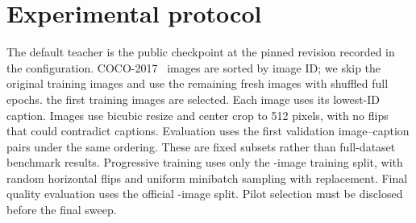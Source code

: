 \documentclass[10pt,twocolumn,letterpaper]{article}
\begin{document}
\section{Experimental protocol}
The default teacher is the public \texttt{\StudyTeacher} checkpoint
at the pinned revision recorded in the configuration.
\ifStudySD
COCO-2017~\cite{chen2015coco} images are sorted by image ID;
\ifStudyContinuation we skip the original \StudyTrainOffset{} training images and
use the remaining \StudyTrainCount{} fresh images with shuffled full epochs.
\else the first \StudyTrainCount{} training images are selected.\fi
Each image uses its lowest-ID caption. Images use
bicubic resize and center crop to 512 pixels, with no flips that could contradict
captions. Evaluation uses the first \StudyReferenceCount{} validation image--caption
pairs under the same ordering. These are fixed subsets rather than full-dataset
benchmark results.
\else
Progressive training uses only the
\StudyTrainCount{}-image training split, with random horizontal flips and uniform
minibatch sampling with replacement. Final quality evaluation uses the official
\StudyReferenceCount{}-image \StudyReferenceSplit{} split.
\fi
Pilot selection must be disclosed before the final sweep. \StudySplitNote{}
\end{document}

